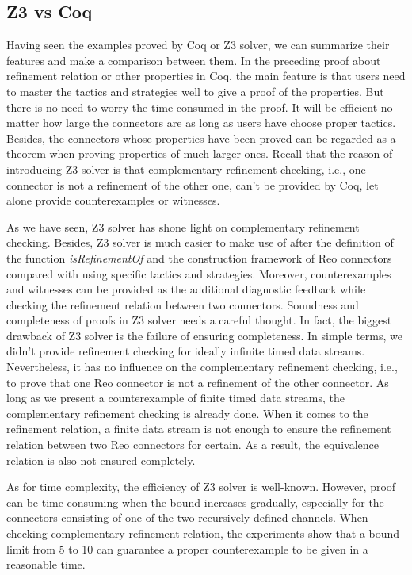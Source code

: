 \documentclass[3p,times]{elsarticle}
\begin{document}
\subsection{Z3 vs Coq}
Having seen the examples proved by Coq or Z3 solver, we can summarize their features and make a comparison between them.
In the preceding proof about refinement relation or other properties in Coq, the main feature is that users need to master the tactics and strategies well to give a proof of the properties. But there is no need to worry the time consumed in the proof. It will be efficient no matter how large the connectors are as long as users have choose proper tactics. Besides, the connectors whose properties have been proved can be regarded as a theorem when proving properties of much larger ones. Recall that the reason of introducing Z3 solver is that complementary refinement checking, i.e., one connector is not  a refinement of the other one, can't be provided by Coq, let alone provide counterexamples or witnesses.

As we have seen, Z3 solver has shone light on complementary refinement checking. Besides, Z3 solver is much easier to make use of after the definition of the function \emph{isRefinementOf} and the construction framework of Reo connectors compared with using specific tactics and strategies. Moreover, counterexamples and witnesses can be provided as the additional diagnostic feedback while checking the refinement relation between two connectors.
Soundness and completeness of proofs in Z3 solver needs a careful thought. In fact, the biggest drawback of Z3 solver is the failure of ensuring completeness. In simple terms, we didn't provide refinement checking for ideally infinite timed data streams. Nevertheless, it has no influence on the complementary refinement checking, i.e., to prove that one Reo connector is not a refinement of the other connector. As long as we present a counterexample of finite timed data streams, the complementary refinement checking is already done. When it comes to the refinement relation, a finite data stream is not enough to ensure the refinement relation between two Reo connectors for certain. As a result, the equivalence relation is also not ensured completely.

As for time complexity, the efficiency of Z3 solver is well-known. However, proof can be time-consuming when the bound increases gradually, especially for the connectors consisting of one of the two recursively defined channels. When checking complementary refinement relation, the experiments show that a bound limit from 5 to 10 can guarantee a proper counterexample to be given in a reasonable time.
\end{document}
